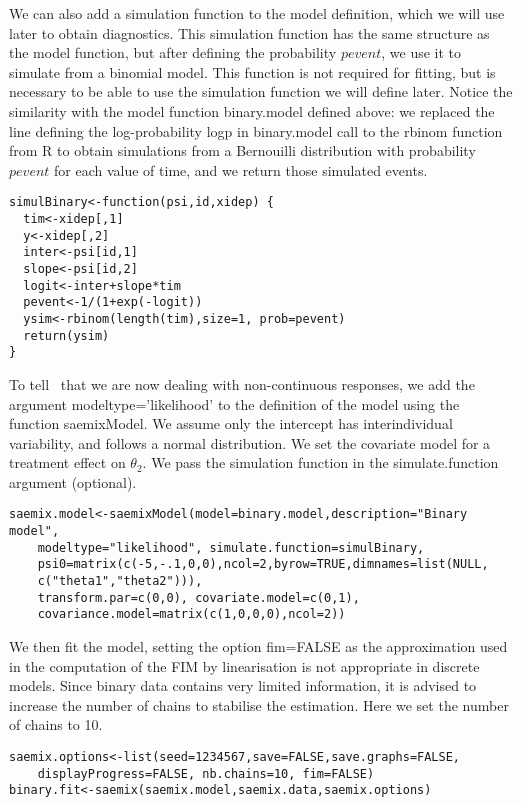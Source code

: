 We can also add a simulation function to the model definition, which we will use later to obtain diagnostics. This simulation function has the same structure as the model function, but after defining the probability $pevent$, we use it to simulate from a binomial model. This function is not required for fitting, but is necessary to be able to use the simulation function we will define later. Notice the similarity with the model function {\sf binary.model} defined above: we replaced the line defining the log-probability {\sf logp} in {\sf binary.model}  call to the {\sf rbinom} function from {\sf R} to obtain simulations from a Bernouilli distribution with probability $pevent$ for each value of time, and we return those simulated events.
\begin{verbatim}
simulBinary<-function(psi,id,xidep) {
  tim<-xidep[,1]
  y<-xidep[,2]
  inter<-psi[id,1]
  slope<-psi[id,2]
  logit<-inter+slope*tim
  pevent<-1/(1+exp(-logit))
  ysim<-rbinom(length(tim),size=1, prob=pevent)
  return(ysim)
}
\end{verbatim}

To tell \monolix~that we are now dealing with non-continuous responses, we add the argument {\sf modeltype='likelihood'} to the definition of the model using the function {\sf saemixModel}. We assume only the intercept has interindividual variability, and follows a normal distribution. We set the covariate model for a treatment effect on $\theta_2$. We pass the simulation function in the {\sf simulate.function} argument (optional).
\begin{verbatim}
saemix.model<-saemixModel(model=binary.model,description="Binary model",
    modeltype="likelihood", simulate.function=simulBinary,
    psi0=matrix(c(-5,-.1,0,0),ncol=2,byrow=TRUE,dimnames=list(NULL,
    c("theta1","theta2"))),
    transform.par=c(0,0), covariate.model=c(0,1),
    covariance.model=matrix(c(1,0,0,0),ncol=2))
\end{verbatim}

We then fit the model, setting the option {\sf fim=FALSE} as the approximation used in the computation of the FIM by linearisation is not appropriate in discrete models. Since binary data contains very limited information, it is advised to increase the number of chains to stabilise the estimation. Here we set the number of chains to 10.
\begin{verbatim}
saemix.options<-list(seed=1234567,save=FALSE,save.graphs=FALSE, 
    displayProgress=FALSE, nb.chains=10, fim=FALSE)
binary.fit<-saemix(saemix.model,saemix.data,saemix.options)
\end{verbatim}

